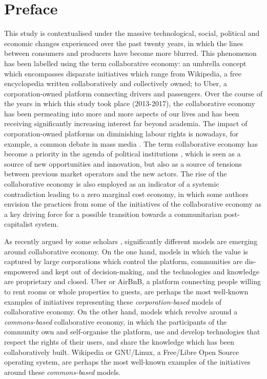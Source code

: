 \setcounter{chapter}{-1}
\chapter{Preface}
\label{chapter:preface}

This study is contextualised under the massive technological, social, political and economic changes experienced over the past twenty years, in which the lines between consumers and producers have become more blurred. This phenomenon has been labelled using the term collaborative economy: an umbrella concept which encompasses disparate initiatives which range from Wikipedia, a free encyclopedia written collaboratively and collectively owned; to Uber, a corporation-owned platform connecting drivers and passengers. Over the course of the years in which this study took place (2013-2017), the collaborative economy has been permeating into more and more aspects of our lives and has been receiving significantly increasing interest far beyond academia. The impact of corporation-owned platforms on diminishing labour rights is nowadays, for example, a common debate in mass media \parencite[e.g.][]{bbc-collab:2017:Online, elpais-collab:2017:Online}. The term collaborative economy has become a priority in the agenda of political institutions \parencite[e.g.][]{euc-collab:2017:Online, generalitatcollab2017}, which is seen as a source of new opportunities and innovation, but also as a source of tensions between previous market operators and the new actors. The rise of the collaborative economy is also employed as an indicator of a systemic contradiction leading to a zero marginal cost economy, in which some authors \parencite[e.g.][]{bauwens2014communism, mason2016postcapitalism} envision the practices from some of the initiatives of the collaborative economy as a key driving force for a possible transition towards a communitarian post-capitalist system.

As recently argued by some scholars \parencite{mayo-unicorns:2017:Online}, significantly different models are emerging around collaborative economy. On the one hand, models in which the value is captured by large corporations which control the platform, communities are dis-empowered and kept out of decision-making, and the technologies and knowledge are proprietary and closed. Uber or AirBnB, a platform connecting people willing to rent rooms or whole properties to guests, are perhaps the most well-known examples of initiatives representing these \textit{corporation-based} models of collaborative economy. On the other hand, models which revolve around a \textit{commons-based} collaborative economy, in which the participants of the community own and self-organise the platform, use and develop technologies that respect the rights of their users, and share the knowledge which has been collaboratively built. Wikipedia or GNU/Linux, a Free/Libre Open Source operating system, are perhaps the most well-known examples of the initiatives around these \textit{commons-based} models. 

